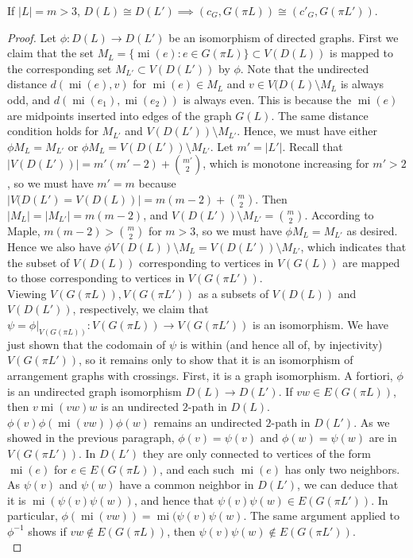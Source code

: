 \documentclass[11pt, oneside]{article}
\newcommand{\mi}{\operatorname{mi}}
\begin{document}
\begin{lem}\label{dirtograph}
If $|L|=m > 3$, $D(L) \cong D(L') \implies (c_G, G(\pi L))\cong (c'_G, G(\pi L'))$.
\end{lem}
\begin{proof}
Let $\phi: D(L) \to D(L')$ be an isomorphism of directed graphs. First we claim that the set $M_L = \{ \mi(e): e \in G( \pi L)\} \subset V(D(L))$ is mapped to the corresponding set $M_{L'} \subset V(D(L'))$ by $\phi$. Note that the undirected distance $d(\mi(e), v)$ for $\mi(e) \in M_L$ and $v \in V(D(L) \setminus M_L$ is always odd, and $d(\mi(e_1), \mi(e_2))$ is always even. This is because the $\mi(e)$ are midpoints inserted into edges of the graph $G(L)$. The same distance condition holds for $M_{L'}$ and $V(D(L')) \setminus M_{L'}$. Hence, we must have either $\phi M_{L} = M_{L'}$ or $\phi M_{L} = V(D(L')) \setminus M_{L'}$. Let $m' = |L'|$. Recall that $|V(D(L'))| = m'(m'-2) + {m' \choose 2}$, which is monotone increasing for $m' > 2$, so we must have $m' = m$ because $|V(D(L') = V(D(L))| = m(m-2) + {m \choose 2}$. Then $|M_L| = |M_{L'}|= m(m-2)$, and $V(D(L')) \setminus M_{L'} = {m \choose 2}$. According to Maple, $m(m-2) > { m \choose 2}$ for $m > 3$, so we must have $\phi M_{L} = M_{L'}$ as desired. Hence we also have $\phi  V(D(L)) \setminus M_{L} = V(D(L')) \setminus M_{L'}$, which indicates that the subset of $V(D(L))$ corresponding to vertices in $V(G(L))$ are mapped to those corresponding to vertices in $V(G(\pi L'))$. \\

Viewing $V(G( \pi L)), V(G( \pi L'))$ as a subsets of $V(D(L))$ and $V(D(L'))$, respectively, we claim that $\psi = \phi|_{V(G(\pi L))}:V(G( \pi L)) \to V(G( \pi L'))$ is an isomorphism. We have just shown that the codomain of $\psi$ is within (and hence all of, by injectivity) $V(G(\pi L'))$, so it remains only to show that it is an isomorphism of arrangement graphs with crossings. First, it is a graph isomorphism. A fortiori, $\phi$ is an undirected graph isomorphism $D(L) \to D(L')$. If $vw \in E(G( \pi L))$, then $v\mi(vw)w$ is an undirected $2$-path in $D(L)$. $\phi(v) \phi(\mi (vw)) \phi (w)$ remains an undirected $2$-path in $D(L')$. As we showed in the previous paragraph, $\phi(v) = \psi(v)$ and $\phi(w)= \psi(w)$ are in $V(G( \pi L'))$. In $D(L')$ they are only connected to vertices of the form $\mi (e)$ for $e \in E(G(\pi L))$, and each such $\mi(e)$ has only two neighbors. As $\psi(v)$ and $\psi(w)$ have a common neighbor in $D(L')$, we can deduce that it is $\mi(\psi(v)\psi(w))$, and hence that $\psi(v)\psi(w) \in E(G(\pi L'))$. In particular, $\phi(\mi(vw)) = \mi(\psi(v) \psi(w)$. The same argument applied to $\phi^{-1}$ shows if $vw \notin E(G(\pi L))$, then $\psi(v)\psi(w) \notin E(G( \pi L'))$.\\


\end{proof}
\end{document}
